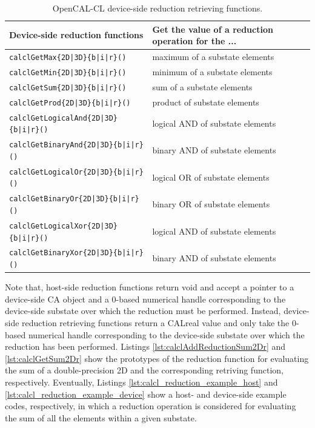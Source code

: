 \begin{table}
  \centering
  \footnotesize
  \begin{tabular}{l|l}
    \hline
    Device-side reduction functions & Get the value of a reduction operation for the ... \\
    \hline
    \verb'calclGetMax{2D|3D}{b|i|r}()'        & maximum of a substate elements\\
    \verb'calclGetMin{2D|3D}{b|i|r}()'        & minimum of a substate elements\\
    \verb'calclGetSum{2D|3D}{b|i|r}()'        & sum of a substate elements\\
    \verb'calclGetProd{2D|3D}{b|i|r}()'       & product of substate elements\\
    \verb'calclGetLogicalAnd{2D|3D}{b|i|r}()' & logical AND of substate elements\\
    \verb'calclGetBinaryAnd{2D|3D}{b|i|r}()'  & binary AND of substate elements\\
    \verb'calclGetLogicalOr{2D|3D}{b|i|r}()'  & logical OR of substate elements\\
    \verb'calclGetBinaryOr{2D|3D}{b|i|r}()'   & binary OR of substate elements\\
    \verb'calclGetLogicalXor{2D|3D}{b|i|r}()'   & logical AND of substate elements\\
    \verb'calclGetBinaryXor{2D|3D}{b|i|r}()'  & binary AND of substate elements\\
    \hline
  \end{tabular}
  \caption{OpenCAL-CL device-side reduction retrieving functions.}
  \label{tab:calcl-device-reductions}
\end{table}


Note that, host-side reduction functions return void and accept a
pointer to a device-side CA object and a 0-based numerical handle
corresponding to the device-side substate over which the reduction
must be performed. Instead, device-side reduction retrieving functions
return a CALreal value and only take the 0-based numerical handle
corresponding to the device-side substate over which the reduction has
been performed. Listings \ref{lst:calclAddReductionSum2Dr} and
\ref{lst:calclGetSum2Dr} show the prototypes of the reduction function for evaluating the sum of a double-precision 2D and the corresponding retriving function, respectively. Eventually, Listings
\ref{lst:calcl_reduction_example_host} and
\ref{lst:calcl_reduction_example_device} show a host- and device-side
example codes, respectively, in which a reduction operation is
considered for evaluating the sum of all the elements within a given
substate.


